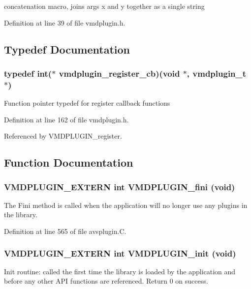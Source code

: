 concatenation macro, joins args x and y together as a single string 

Definition at line 39 of file vmdplugin.h.

\subsection{Typedef Documentation}
\subsubsection{\setlength{\rightskip}{0pt plus 5cm}typedef int($\ast$ vmdplugin\_\-register\_\-cb)(void $\ast$, {\bf vmdplugin\_\-t} $\ast$)}\label{vmdplugin_8h_a15}


Function pointer typedef for register callback functions 

Definition at line 162 of file vmdplugin.h.

Referenced by VMDPLUGIN\_\-register.

\subsection{Function Documentation}
\subsubsection{\setlength{\rightskip}{0pt plus 5cm}VMDPLUGIN\_\-EXTERN int VMDPLUGIN\_\-fini (void)}\label{vmdplugin_8h_a19}


The Fini method is called when the application will no longer use  any plugins in the library. 

Definition at line 565 of file avsplugin.C.
\subsubsection{\setlength{\rightskip}{0pt plus 5cm}VMDPLUGIN\_\-EXTERN int VMDPLUGIN\_\-init (void)}\label{vmdplugin_8h_a16}


Init routine: called the first time the library is loaded by the  application and before any other API functions are referenced. Return 0 on success. 

